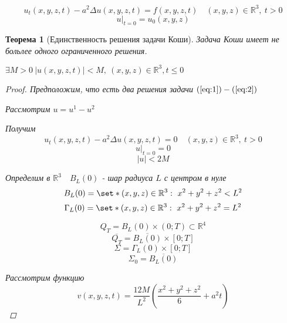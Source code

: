 \documentclass[a4paper]{article}
\DeclarePairedDelimiter\set\{\}
\newtheorem*{theorem}{Теорема}
\theoremstyle{definition}
\theoremstyle{remark}
\begin{document}
\begin{equation}
    u_t(x,y,z,t) - a^2 \Delta u(x,y,z,t) = f(x,y,z,t) \quad 
    (x,y,z) \in \mathbb{R}^3, \ t > 0
    \label{eq:1}
\end{equation}
\begin{equation}
    u|_{t = 0} = u_0(x,y,z)
    \label{eq:2}
\end{equation}
\begin{tcolorbox}[title=Теорема о единственности решения задачи Коши,%
    enhanced,breakable,skin first=enhanced,skin middle=enhanced,skin last=enhanced]
\begin{theorem}[Единственность решения задачи Коши]
    Задача Коши имеет не больлее одного ограниченного решения.

    $ \exists M > 0 \ |u(x,y,z,t)| < M, \ (x,y,z) \in \mathbb{R}^3, t \leq 0 $ 

    \begin{proof}
        Предположим, что есть два решения задачи $ (\ref{eq:1}) - (\ref{eq:2}) $ 

        Рассмотрим $ u = u^{1} - u^{2} $ 

        Получим
        \begin{equation}
            u_t(x,y,z,t) - a^2 \Delta u(x,y,z,t) = 0 \quad 
            (x,y,z) \in \mathbb{R}^3, \ t > 0
            \label{eq:3}
        \end{equation}
        \begin{equation}
            u|_{t = 0} = 0
            \label{eq:4}
        \end{equation}
        \[
            |u| < 2M
        \]

        Определим в $ \mathbb{R}^3 \quad B_L(0) $ - шар радиуса $ L $ с центром
        в нуле
        \[
            B_L(0) = \set*{(x,y,z) \in \mathbb{R}^3: \ x^2+y^2+z^2 < L^2}
        \]
        \[
            \Gamma_L(0) = \set*{(x,y,z) \in \mathbb{R}^3: \ x^2+y^2+z^2 = L^2}
        \]

        \[
            Q_T = B_L(0) \times (0; T) \subset \mathbb{R}^4
        \]
        \[
            \overline{Q_T} = \overline{B_L(0)} \times [0;T]
        \]
        \[
            \Sigma = \Gamma_L(0) \times [0;T]
        \]
        \[
            \Sigma_0 = \overline{B_L(0)}
        \]

        Рассмотрим функцию
        \begin{equation}
            v(x,y,z,t) = \frac{12M}{L^2} \left(\frac{x^2+y^2+z^2}{6} + a^2t \right)
            \label{eq:5}
        \end{equation}


\end{proof}
\end{theorem}
\end{tcolorbox}
\end{document}
